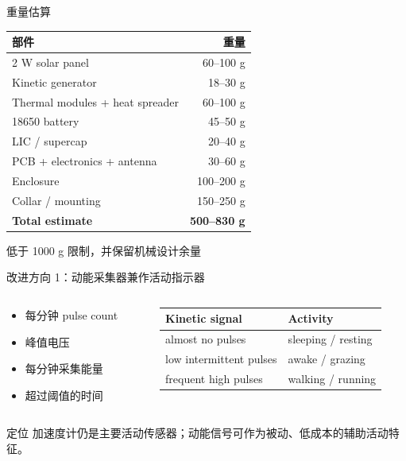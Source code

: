 \documentclass[aspectratio=169,11pt]{ctexbeamer}
\begin{document}
\begin{frame}{重量估算}
  \small
  \begin{tabularx}{0.86\textwidth}{@{}lr@{}}
    \toprule
    部件 & 重量 \\
    \midrule
    2 W solar panel & 60--100 g \\
    Kinetic generator & 18--30 g \\
    Thermal modules + heat spreader & 60--100 g \\
    18650 battery & 45--50 g \\
    LIC / supercap & 20--40 g \\
    PCB + electronics + antenna & 30--60 g \\
    Enclosure & 100--200 g \\
    Collar / mounting & 150--250 g \\
    \midrule
    \textbf{Total estimate} & \textbf{500--830 g} \\
    \bottomrule
  \end{tabularx}

  \vspace{0.5em}
  \begin{center}
    \Large 低于 1000 g 限制，并保留机械设计余量
  \end{center}
\end{frame}

\begin{frame}{改进方向 1：动能采集器兼作活动指示器}
  \begin{columns}[T,onlytextwidth]
    \begin{column}{0.48\textwidth}
      \begin{itemize}
        \item 每分钟 pulse count
        \item 峰值电压
        \item 每分钟采集能量
        \item 超过阈值的时间
      \end{itemize}
    \end{column}
    \begin{column}{0.48\textwidth}
      \small
      \begin{tabularx}{\textwidth}{@{}lY@{}}
        \toprule
        Kinetic signal & Activity \\
        \midrule
        almost no pulses & sleeping / resting \\
        low intermittent pulses & awake / grazing \\
        frequent high pulses & walking / running \\
        \bottomrule
      \end{tabularx}
    \end{column}
  \end{columns}
  \vspace{0.8em}
  \begin{block}{定位}
    加速度计仍是主要活动传感器；动能信号可作为被动、低成本的辅助活动特征。
  \end{block}
\end{frame}
\end{document}
